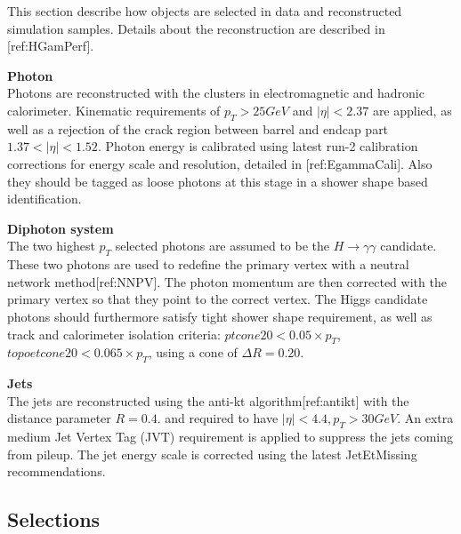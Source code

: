 This section describe how objects are selected in data and reconstructed simulation samples. Details about the reconstruction are described in [ref:HGamPerf]. 
\begin{description}

\item{\textbf{Photon}} \\
Photons are reconstructed with the clusters in electromagnetic and hadronic calorimeter. Kinematic requirements of $p_{T}>25GeV$ and $|\eta|<2.37$ are applied, as well as a rejection of the crack region between barrel and endcap part $1.37<|\eta|<1.52$. Photon energy is calibrated using latest run-2 calibration corrections for energy scale and resolution, detailed in [ref:EgammaCali]. Also they should be tagged as loose photons at this stage in a shower shape based identification. 

\item{\textbf{Diphoton system}} \\
The two highest $p_{T}$ selected photons are assumed to be the $H\to\gamma\gamma$ candidate. These two photons are used to redefine the primary vertex with a neutral network method[ref:NNPV]. The photon momentum are then corrected with the primary vertex so that they point to the correct vertex. The Higgs candidate photons should furthermore satisfy tight shower shape requirement, as well as track and calorimeter isolation criteria: $ptcone20<0.05\times p_{T}$, $topoetcone20<0.065\times p_{T}$, using a cone of $\Delta R = 0.20$. 

\item{\textbf{Jets}} \\
The jets are reconstructed using the anti-kt algorithm[ref:antikt] with the distance parameter $R=0.4$. and required to have $|\eta|<4.4, p_{T}>30GeV$. An extra medium Jet Vertex Tag (JVT) requirement is applied to suppress the jets coming from pileup. The jet energy scale is corrected using the latest JetEtMissing recommendations. 

\end{description}


\subsection{Selections}
\label{subsec:evtsel}

